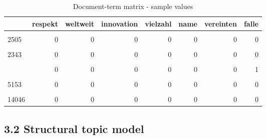 \documentclass[
  12pt,
]{article}
\begin{document}
\begin{table}[H]

\caption{\label{tab:Document term matrix}Document-term matrix - sample values \label{table:dtm}}
\centering
\fontsize{7}{9}\selectfont
\begin{tabular}[t]{lrrrrrrr}
\toprule
  & respekt & weltweit & innovation & vielzahl & name & vereinten & falle\\
\midrule
\cellcolor{gray!6}{2033} & \cellcolor{gray!6}{0} & \cellcolor{gray!6}{0} & \cellcolor{gray!6}{0} & \cellcolor{gray!6}{0} & \cellcolor{gray!6}{0} & \cellcolor{gray!6}{0} & \cellcolor{gray!6}{0}\\
2505 & 0 & 0 & 0 & 0 & 0 & 0 & 0\\
\cellcolor{gray!6}{17722} & \cellcolor{gray!6}{0} & \cellcolor{gray!6}{0} & \cellcolor{gray!6}{0} & \cellcolor{gray!6}{0} & \cellcolor{gray!6}{0} & \cellcolor{gray!6}{0} & \cellcolor{gray!6}{0}\\
2343 & 0 & 0 & 0 & 0 & 0 & 0 & 0\\
\cellcolor{gray!6}{18131} & \cellcolor{gray!6}{0} & \cellcolor{gray!6}{0} & \cellcolor{gray!6}{0} & \cellcolor{gray!6}{0} & \cellcolor{gray!6}{0} & \cellcolor{gray!6}{0} & \cellcolor{gray!6}{0}\\
\addlinespace
3008 & 0 & 0 & 0 & 0 & 0 & 0 & 1\\
\cellcolor{gray!6}{3359} & \cellcolor{gray!6}{0} & \cellcolor{gray!6}{0} & \cellcolor{gray!6}{0} & \cellcolor{gray!6}{0} & \cellcolor{gray!6}{0} & \cellcolor{gray!6}{0} & \cellcolor{gray!6}{0}\\
5153 & 0 & 0 & 0 & 0 & 0 & 0 & 0\\
\cellcolor{gray!6}{1688} & \cellcolor{gray!6}{0} & \cellcolor{gray!6}{0} & \cellcolor{gray!6}{0} & \cellcolor{gray!6}{0} & \cellcolor{gray!6}{0} & \cellcolor{gray!6}{0} & \cellcolor{gray!6}{0}\\
14046 & 0 & 0 & 0 & 0 & 0 & 0 & 0\\
\bottomrule
\end{tabular}
\end{table}

\hypertarget{structural-topic-model}{%
\subsection{3.2 Structural topic model}\label{structural-topic-model}}
\end{document}
